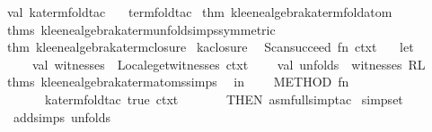 \begin{isabellebody}
val\ ka{}term{}fold{}tac\ {}\isanewline
\ \ term{}fold{}tac\ %
\isaantiq
thm\ kleene{}algebra{}ka{}term{}fold{}atom{}%
\endisaantiq
\ %
\isaantiq
thms\ kleene{}algebra{}ka{}term{}unfold{}simps{}symmetric{}{}%
\endisaantiq
\ %
\isaantiq
thm\ kleene{}algebra{}ka{}term{}closure{}%
\endisaantiq
\isanewline
{}\isanewline
\isanewline
{}\isamarkupfalse%
\ ka{}closure\ {}\ {}\isanewline
Scan{}succeed\ {}fn\ ctxt\ {}{}\isanewline
\ \ let\isanewline
\ \ \ \ val\ witnesses\ {}\ Locale{}get{}witnesses\ ctxt\isanewline
\ \ \ \ val\ unfolds\ {}\ witnesses\ RL\ %
\isaantiq
thms\ kleene{}algebra{}ka{}term{}atoms{}simps{}%
\endisaantiq
\isanewline
\ \ in\isanewline
\ \ \ \ METHOD\ {}fn\ {}\ {}{}\isanewline
\ \ \ \ \ \ ka{}term{}fold{}tac\ true\ ctxt\ {}\isanewline
\ \ \ \ \ \ THEN\ asm{}full{}simp{}tac\ {}%
\isaantiq
simpset{}%
\endisaantiq
\ addsimps\ unfolds{}\ {}{}\isanewline

\end{isabellebody}
